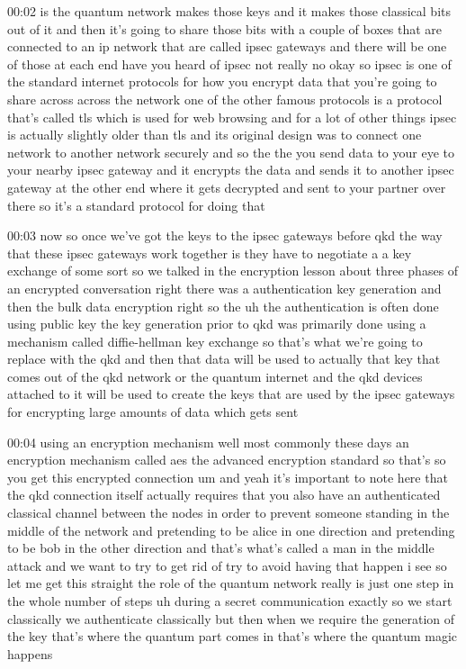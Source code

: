 00:02
is the quantum network makes those keys and it makes those classical
bits out of it and then it's going to share those bits
with a couple of boxes that are connected to an ip network
that are called ipsec gateways and there will be one of those at each end
have you heard of ipsec not really no okay so ipsec is one of the standard
internet protocols for how you encrypt data that you're going to share across
across the network one of the other famous protocols is a
protocol that's called tls which is used for web browsing and for a lot of other
things ipsec is actually slightly older than tls and
its original design was to connect one network to another network
securely and so the the you send data to your eye to
your nearby ipsec gateway and it encrypts the data and sends it to
another ipsec gateway at the other end where it gets decrypted and sent to
your partner over there so it's a standard protocol for doing that

00:03
now so once we've got the keys to the ipsec gateways
before qkd the way that these ipsec gateways work together is they have to
negotiate a a key exchange of some sort so we talked
in the encryption lesson about three phases of an encrypted
conversation right there was a authentication
key generation and then the bulk data encryption right so
the uh the authentication is often done using public key
the key generation prior to qkd was primarily done using a mechanism called
diffie-hellman key exchange so that's what we're going to replace with
the qkd and then that data will be used to actually
that key that comes out of the qkd network or the quantum internet and the qkd
devices attached to it will be used to create the keys that are used by the
ipsec gateways for encrypting large amounts of data which gets sent

00:04
using an encryption mechanism well most commonly
these days an encryption mechanism called aes the advanced encryption standard
so that's so you get this encrypted connection um and
yeah it's important to note here that the qkd connection
itself actually requires that you also have an authenticated classical channel
between the nodes in order to prevent someone
standing in the middle of the network and pretending to be
alice in one direction and pretending to be bob in the other direction
and that's what's called a man in the middle attack and we want to try to get
rid of try to avoid having that happen i see
so let me get this straight the role of the quantum network really is just
one step in the whole number of steps uh during a secret communication exactly
so we start classically we authenticate classically
but then when we require the generation of the key
that's where the quantum part comes in that's where the quantum magic happens

